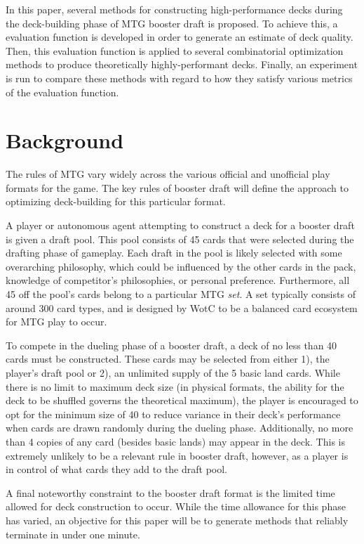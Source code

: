 \documentclass[letterpaper]{article} %
\begin{document}
In this paper, several methods for constructing high-performance decks during the deck-building phase of MTG booster draft is proposed. To achieve this, a evaluation function is developed in order to generate an estimate of deck quality. Then, this evaluation function is applied to several combinatorial optimization methods to produce theoretically highly-performant decks. Finally, an experiment is run to compare these methods with regard to how they satisfy various metrics of the evaluation function.

\section{Background}

The rules of MTG vary widely across the various official and unofficial play formats for the game. The key rules of booster draft will define the approach to optimizing deck-building for this particular format.

A player or autonomous agent attempting to construct a deck for a booster draft is given a draft pool. This pool consists of 45 cards that were selected during the drafting phase of gameplay. Each draft in the pool is likely selected with some overarching philosophy, which could be influenced by the other cards in the pack, knowledge of competitor's philosophies, or personal preference. Furthermore, all 45 off the pool's cards belong to a particular MTG \textit{set}. A set typically consists of around 300 card types, and is designed by WotC to be a balanced card ecosystem for MTG play to occur.

To compete in the dueling phase of a booster draft, a deck of no less than 40 cards must be constructed. These cards may be selected from either 1), the player's draft pool or 2), an unlimited supply of the 5 basic land cards. While there is no limit to maximum deck size (in physical formats, the ability for the deck to be shuffled governs the theoretical maximum), the player is encouraged to opt for the minimum size of 40 to reduce variance in their deck's performance when cards are drawn randomly during the dueling phase. Additionally, no more than 4 copies of any card (besides basic lands) may appear in the deck. This is extremely unlikely to be a relevant rule in booster draft, however, as a player is in control of what cards they add to the draft pool.

A final noteworthy constraint to the booster draft format is the limited time allowed for deck construction to occur. While the time allowance for this phase has varied, an objective for this paper will be to generate methods that reliably terminate in under one minute.
\end{document}
